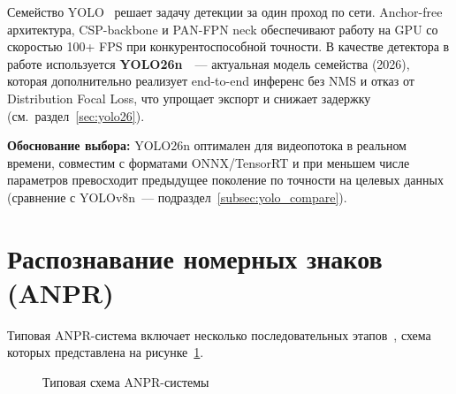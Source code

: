 \documentclass[10pt,a4paper]{report}
\numberwithin{equation}{chapter}
\numberwithin{figure}{chapter}
\numberwithin{table}{chapter}
\begin{document}
Семейство YOLO~\cite{survey2021} решает задачу детекции за один проход по сети.
Anchor-free архитектура, CSP-backbone и PAN-FPN neck обеспечивают
работу на GPU со скоростью 100+ FPS при конкурентоспособной точности.
В качестве детектора в работе используется \textbf{YOLO26n}~\cite{yolo26}~---
актуальная модель семейства (2026), которая дополнительно реализует
end-to-end инференс без NMS и отказ от Distribution Focal Loss, что
упрощает экспорт и снижает задержку (см.\ раздел~\ref{sec:yolo26}).

\noindent\textbf{Обоснование выбора:} YOLO26n оптимален для видеопотока
в реальном времени, совместим с форматами ONNX/TensorRT и при меньшем числе
параметров превосходит предыдущее поколение по точности на целевых данных
(сравнение с YOLOv8n~--- подраздел~\ref{subsec:yolo_compare}).

\section{Распознавание номерных знаков (ANPR)}

Типовая ANPR-система включает несколько последовательных этапов~\cite{laroca2018,laroca2021},
схема которых представлена на рисунке~\ref{fig:anpr_flow}.

\begin{figure}[H]
\centering
{}
\caption{Типовая схема ANPR-системы}
\label{fig:anpr_flow}
\end{figure}
\end{document}
